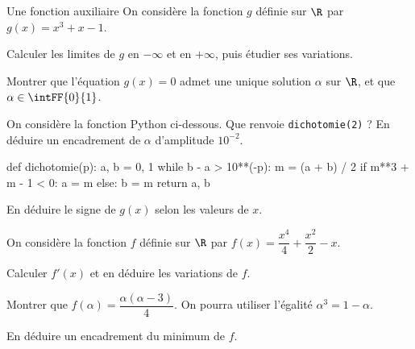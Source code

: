 \begin{exercice}[3]{Une fonction auxiliaire}
On considère la fonction $g$ définie sur $\R$ par $g(x)=x^{3}+x-1$.
\begin{questions}
  \item Calculer les limites de $g$ en $-\infty$ et en $+\infty$, puis étudier ses variations.
  \item Montrer que l'équation $g(x)=0$ admet une unique solution $\alpha$ sur $\R$, et que $\alpha\in\intFF{0}{1}$.
  \item On considère la fonction Python ci-dessous. Que renvoie \lstinline[style=otPython]!dichotomie(2)! ? En déduire un
    encadrement de $\alpha$ d'amplitude $10^{-2}$.
\begin{python}
def dichotomie(p):
    a, b = 0, 1
    while b - a > 10**(-p):
        m = (a + b) / 2
        if m**3 + m - 1 < 0:
            a = m
        else:
            b = m
    return a, b
\end{python}
  \item En déduire le signe de $g(x)$ selon les valeurs de $x$.
\end{questions}
On considère la fonction $f$ définie sur $\R$ par $f(x)=\dfrac{x^{4}}{4}+\dfrac{x^{2}}{2}-x$.
\begin{questions}[resume]
  \item Calculer $f'(x)$ et en déduire les variations de $f$.
  \item Montrer que $f(\alpha)=\dfrac{\alpha(\alpha-3)}{4}$. On pourra utiliser l'égalité $\alpha^{3}=1-\alpha$.
  \item En déduire un encadrement du minimum de $f$.
\end{questions}
\end{exercice}

